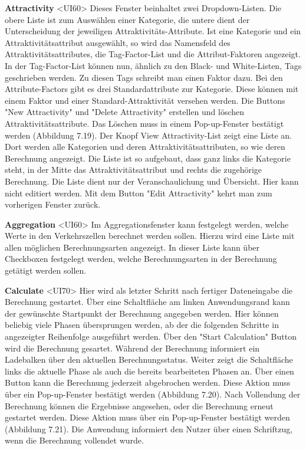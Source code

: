 \documentclass[parskip=full]{scrartcl} %
\begin{document}
\newpage

\textbf{Attractivity }<UI60>
Dieses Fenster beinhaltet zwei Dropdown-Listen. Die obere Liste ist zum Auswählen einer Kategorie, die untere dient der Unterscheidung der jeweiligen Attraktivitäts-Attribute.
Ist eine Kategorie und ein Attraktivitätsattribut ausgewählt, so wird das Namensfeld des Attraktivitätsattributes, die Tag-Factor-List und die Attribut-Faktoren angezeigt.
In der Tag-Factor-List können nun, ähnlich zu den Black- und White-Listen, Tags geschrieben werden. Zu diesen Tags schreibt man einen Faktor dazu.
Bei den Attribute-Factors gibt es drei Standardattribute zur Kategorie. Diese können mit einem Faktor und einer Standard-Attraktivität versehen werden.
Die Buttons "New Attractivity" und "Delete Attractivity" erstellen und löschen Attraktivitätsattribute. Das Löschen muss in einem Pop-up-Fenster bestätigt werden (Abbildung 7.19).
Der Knopf View Attractivity-List zeigt eine Liste an. Dort werden alle Kategorien und deren Attraktivitätsattributen, so wie deren Berechnung angezeigt.
Die Liste ist so aufgebaut, dass ganz links die Kategorie steht, in der Mitte das Attraktivitätsattribut und rechts die zugehörige Berechnung.
Die Liste dient nur der Veranschaulichung und Übersicht. Hier kann nicht editiert werden.
Mit dem Button "Edit Attractivity" kehrt man zum vorherigen Fenster zurück.

\textbf{Aggregation }<UI60>
Im Aggregationsfenster kann festgelegt werden, welche Werte in den Verkehrszellen berechnet werden sollen. Hierzu wird eine Liste mit allen möglichen Berechnungsarten angezeigt. In dieser Liste kann über Checkboxen festgelegt werden, welche Berechnungsarten in der Berechnung getätigt werden sollen.

\textbf{Calculate }<UI70>
Hier wird als letzter Schritt nach fertiger Dateneingabe die Berechnung gestartet. Über eine Schaltfläche am linken Anwendungsrand kann der gewünschte Startpunkt der Berechnung angegeben werden. Hier können beliebig viele Phasen übersprungen werden, ab der die folgenden Schritte in angezeigter Reihenfolge ausgeführt werden. Über den "Start Calculation" Button wird die Berechnung gesartet.
Während der Berechnung informiert ein Ladebalken über den aktuellen Berechnungsstatus. Weiter zeigt die Schaltfläche links die aktuelle Phase als auch die bereits bearbeiteten Phasen an. Über einen Button kann die Berechnung jederzeit abgebrochen werden. Diese Aktion muss über ein Pop-up-Fenster bestätigt werden (Abbildung 7.20).
Nach Vollendung der Berechnung können die Ergebnisse angesehen, oder die Berechnung erneut gestartet werden. Diese Aktion muss über ein Pop-up-Fenster bestätigt werden (Abbildung 7.21).
Die Anwendung informiert den Nutzer über einen Schriftzug, wenn die Berechnung vollendet wurde.
\end{document}
